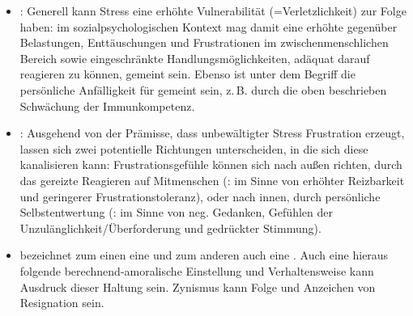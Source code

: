 \begin{itemize}
  \item {}:
Generell kann Stress eine erhöhte Vulnerabilität
(=Verletzlichkeit) zur Folge haben: im sozialpsychologischen
Kontext mag damit eine erhöhte  gegenüber Belastungen, Enttäuschungen und
Frustrationen im zwischenmenschlichen Bereich sowie
eingeschränkte Handlungsmöglichkeiten, adäquat darauf
reagieren zu können, gemeint sein. Ebenso ist unter dem
Begriff die persönliche Anfälligkeit für  gemeint sein, z.\,B. durch die oben
beschrieben Schwächung der Immunkompetenz.
\item 
{}:
Ausgehend von der Prämisse, dass unbewältigter Stress
Frustration erzeugt, lassen sich zwei potentielle Richtungen
unterscheiden, in die sich diese kanalisieren kann:
Frustrationsgefühle können sich nach außen richten, durch
das gereizte Reagieren auf Mitmenschen (: im
Sinne von erhöhter Reizbarkeit und geringerer
Frustrationstoleranz), oder nach innen, durch persönliche
Selbstentwertung (: im Sinne von neg.
Gedanken, Gefühlen der Unzulänglichkeit/Überforderung und
gedrückter Stimmung).

\item 
{} bezeichnet zum einen eine
 und
zum anderen auch eine . Auch eine hieraus
folgende berechnend-amoralische Einstellung und
Verhaltensweise kann Ausdruck dieser Haltung sein. Zynismus
kann Folge und Anzeichen von Resignation sein. 


\end{itemize}
